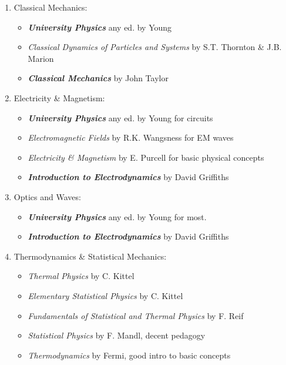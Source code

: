 \begin{enumerate}
    \item Classical Mechanics: 
    \begin{itemize}
        \item {\itshape \bfseries University Physics} any ed. by Young
        \item {\itshape Classical Dynamics of Particles and Systems} by S.T. Thornton \& J.B. Marion
        \item {\itshape \bfseries Classical Mechanics} by John Taylor
    \end{itemize}
    
    \item Electricity \& Magnetism: 
    \begin{itemize}
        \item {\itshape \bfseries University Physics} any ed. by Young for circuits
        \item {\itshape Electromagnetic Fields} by R.K. Wangsness for EM waves
        \item {\itshape Electricity \& Magnetism} by E. Purcell for basic physical concepts
        \item {\itshape \bfseries Introduction to Electrodynamics} by David Griffiths
    \end{itemize}
    
    \item Optics and Waves: 
    \begin{itemize}
        \item {\itshape \bfseries University Physics} any ed. by Young for most.
        \item {\itshape \bfseries Introduction to Electrodynamics} by David Griffiths 
    \end{itemize}
    
    \item Thermodynamics \& Statistical Mechanics: 
    \begin{itemize}
        \item {\itshape Thermal Physics} by C. Kittel
        \item {\itshape Elementary Statistical Physics} by C. Kittel
        \item {\itshape Fundamentals of Statistical and Thermal Physics} by F. Reif
        \item {\itshape Statistical Physics} by F. Mandl, decent pedagogy
        \item {\itshape Thermodynamics} by Fermi, good intro to basic concepts
    \end{itemize}
    

\end{enumerate}
